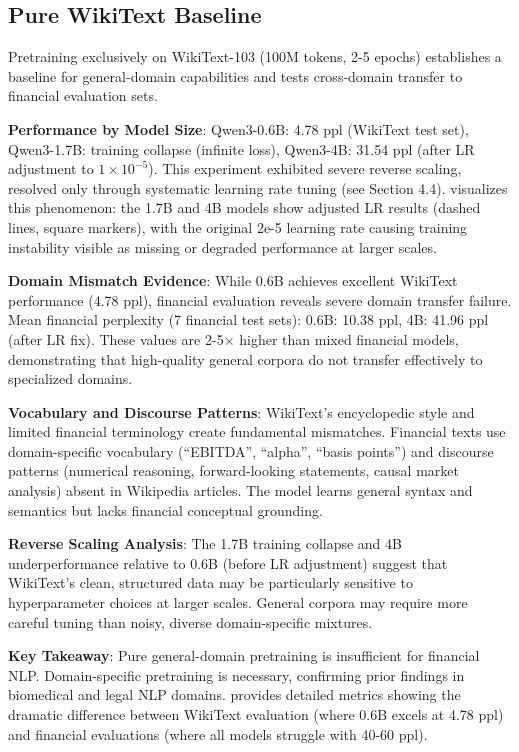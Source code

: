 

\subsection{Pure WikiText Baseline}

Pretraining exclusively on WikiText-103 (100M tokens, 2-5 epochs) establishes a baseline for general-domain capabilities and tests cross-domain transfer to financial evaluation sets.

\textbf{Performance by Model Size}: Qwen3-0.6B: 4.78 ppl (WikiText test set), Qwen3-1.7B: training collapse (infinite loss), Qwen3-4B: 31.54 ppl (after LR adjustment to $1 \times 10^{-5}$). This experiment exhibited severe reverse scaling, resolved only through systematic learning rate tuning (see Section 4.4).  visualizes this phenomenon: the 1.7B and 4B models show adjusted LR results (dashed lines, square markers), with the original 2e-5 learning rate causing training instability visible as missing or degraded performance at larger scales.

\textbf{Domain Mismatch Evidence}: While 0.6B achieves excellent WikiText performance (4.78 ppl), financial evaluation reveals severe domain transfer failure. Mean financial perplexity (7 financial test sets): 0.6B: 10.38 ppl, 4B: 41.96 ppl (after LR fix). These values are 2-5$\times$ higher than mixed financial models, demonstrating that high-quality general corpora do not transfer effectively to specialized domains.

\textbf{Vocabulary and Discourse Patterns}: WikiText's encyclopedic style and limited financial terminology create fundamental mismatches. Financial texts use domain-specific vocabulary (``EBITDA'', ``alpha'', ``basis points'') and discourse patterns (numerical reasoning, forward-looking statements, causal market analysis) absent in Wikipedia articles. The model learns general syntax and semantics but lacks financial conceptual grounding.

\textbf{Reverse Scaling Analysis}: The 1.7B training collapse and 4B underperformance relative to 0.6B (before LR adjustment) suggest that WikiText's clean, structured data may be particularly sensitive to hyperparameter choices at larger scales. General corpora may require more careful tuning than noisy, diverse domain-specific mixtures.

\textbf{Key Takeaway}: Pure general-domain pretraining is insufficient for financial NLP. Domain-specific pretraining is necessary, confirming prior findings in biomedical and legal NLP domains.  provides detailed metrics showing the dramatic difference between WikiText evaluation (where 0.6B excels at 4.78 ppl) and financial evaluations (where all models struggle with 40-60 ppl).

